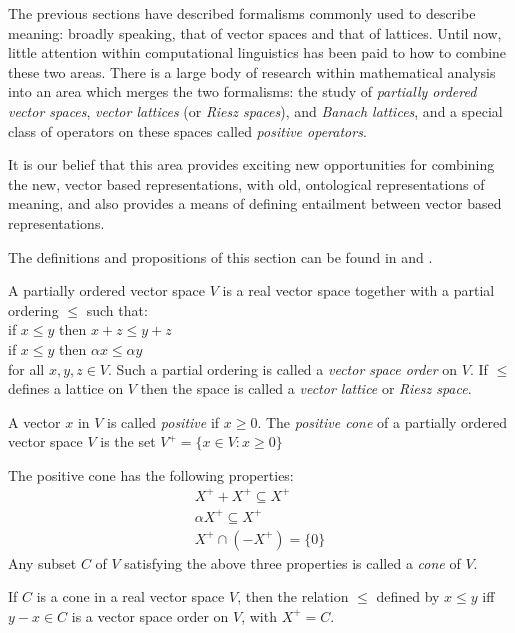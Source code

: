 The previous sections have described formalisms commonly used to describe meaning: broadly speaking, that of vector spaces and that of lattices. Until now, little attention within computational linguistics has been paid to how to combine these two areas. There is a large body of research within mathematical analysis into an area which merges the two formalisms: the study of \emph{partially ordered vector spaces}, \emph{vector lattices} (or \emph{Riesz spaces}), and \emph{Banach lattices}, and a special class of operators on these spaces called \emph{positive operators}.

It is our belief that this area provides exciting new opportunities for combining the new, vector based representations, with old, ontological representations of meaning, and also provides a means of defining entailment between vector based representations.

The definitions and propositions of this section can be found in \cite{Abramovich:02} and \cite{Aliprantis:85}.

\begin{defn}
A partially ordered vector space $V$ is a real vector space together with a partial ordering $\le$ such that:
\vspace{0.1cm}\\
\indent if $x \le y$ then $x + z \le y + z$\\
\indent if $x \le y$ then $\alpha x \le \alpha y$
\vspace{0.1cm}\\
for all $x,y,z \in V$. Such a partial ordering is called a \emph{vector space order} on $V$. If $\le$ defines a lattice on $V$ then the space is called a \emph{vector lattice} or \emph{Riesz space}.

A vector $x$ in $V$ is called \emph{positive} if $x \ge 0$. The \emph{positive cone} of a partially ordered vector space $V$ is the set $V^+ = \{x \in V : x \ge 0\}$
\end{defn}

The positive cone has the following properties:
\begin{eqnarray*}
X^+ + X^+ \subseteq X^+\\
\alpha X^+ \subseteq X^+\\
X^+ \cap (-X^+) = \{0\}
\end{eqnarray*}
Any subset $C$ of $V$ satisfying the above three properties is called a \emph{cone} of $V$.

\begin{prop}
If $C$ is a cone in a real vector space $V$, then the relation $\le$ defined by $x \le y$ iff $y - x \in C$ is a vector space order on $V$, with $X^+ = C$.
\end{prop}

